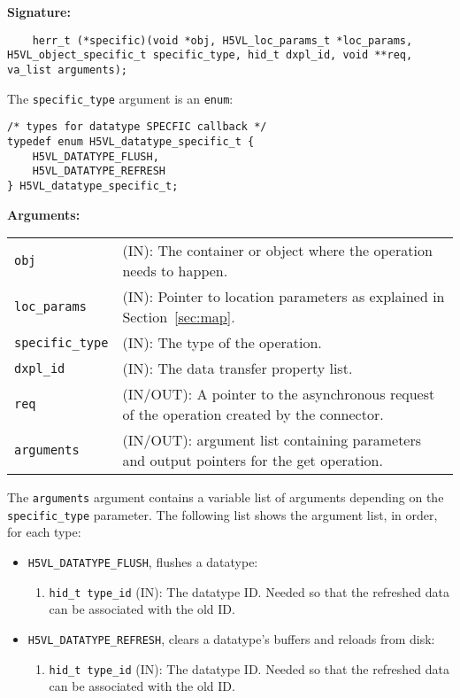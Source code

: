 \begin{mdframed}[style=bgbox]
\textbf{Signature:}
\begin{lstlisting}
	herr_t (*specific)(void *obj, H5VL_loc_params_t *loc_params, H5VL_object_specific_t specific_type, hid_t dxpl_id, void **req, va_list arguments);
\end{lstlisting}

The \texttt{specific\_type} argument is an \texttt{enum}:
\begin{lstlisting}
/* types for datatype SPECFIC callback */                                        
typedef enum H5VL_datatype_specific_t {                                          
    H5VL_DATATYPE_FLUSH,                                                         
    H5VL_DATATYPE_REFRESH                                                        
} H5VL_datatype_specific_t;  
\end{lstlisting}

\textbf{Arguments:}\\
\begin{tabular}{l p{13.5cm}}
  \texttt{obj} & (IN): The container or object where the operation needs to happen.\\
  \texttt{loc\_params} & (IN): Pointer to location parameters as explained in Section~\ref{sec:map}.\\
  \texttt{specific\_type} & (IN): The type of the operation.\\
  \texttt{dxpl\_id} & (IN): The data transfer property list.\\
  \texttt{req} & (IN/OUT): A pointer to the asynchronous request of the
  operation created by the connector.\\
  \texttt{arguments} & (IN/OUT): argument list containing parameters and
  output pointers for the get operation. \\
\end{tabular}
\end{mdframed}

The \texttt{arguments} argument contains a variable list of arguments
depending on the \texttt{specific\_type} parameter. The following list shows
the argument list, in order, for each type:

\begin{itemize}
\item \texttt{H5VL\_DATATYPE\_FLUSH}, flushes a datatype:
  \begin{enumerate}
  \item \texttt{hid\_t type\_id} (IN): The datatype ID. Needed so that the refreshed data can be associated with the old ID. 
  \end{enumerate}
\item \texttt{H5VL\_DATATYPE\_REFRESH}, clears a datatype's buffers and reloads from disk:
  \begin{enumerate}
  \item \texttt{hid\_t type\_id} (IN): The datatype ID. Needed so that the refreshed data can be associated with the old ID. 
  \end{enumerate}
\end{itemize}

